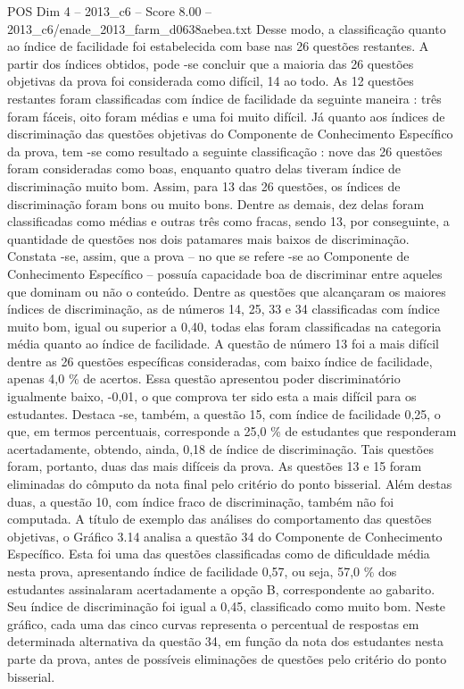 \begin{textsample}{POS Dim 4 – 2013\_c6 – Score 8.00 – 2013\_c6/enade\_2013\_farm\_d0638aebea.txt}
Desse modo, a classificação quanto ao índice de facilidade foi estabelecida com base nas 26 questões restantes.
A partir dos índices obtidos, pode -se concluir que a maioria das 26 questões objetivas da prova foi considerada como difícil, 14 ao todo.
As 12 questões restantes foram classificadas com índice de facilidade da seguinte maneira : três foram fáceis, oito foram médias e uma foi muito difícil.
Já quanto aos índices de discriminação das questões objetivas do Componente de Conhecimento Específico da prova, tem -se como resultado a seguinte classificação : nove das 26 questões foram consideradas como boas, enquanto quatro delas tiveram índice de discriminação muito bom.
Assim, para 13 das 26 questões, os índices de discriminação foram bons ou muito bons.
Dentre as demais, dez delas foram classificadas como médias e outras três como fracas, sendo 13, por conseguinte, a quantidade de questões nos dois patamares mais baixos de discriminação.
Constata -se, assim, que a prova – no que se refere -se ao Componente de Conhecimento Específico – possuía capacidade boa de discriminar entre aqueles que dominam ou não o conteúdo.
Dentre as questões que alcançaram os maiores índices de discriminação, as de números 14, 25, 33 e 34 classificadas com índice muito bom, igual ou superior a 0,40, todas elas foram classificadas na categoria média quanto ao índice de facilidade.
A questão de número 13 foi a mais difícil dentre as 26 questões específicas consideradas, com baixo índice de facilidade, apenas 4,0 \% de acertos.
Essa questão apresentou poder discriminatório igualmente baixo, -0,01, o que comprova ter sido esta a mais difícil para os estudantes.
Destaca -se, também, a questão 15, com índice de facilidade 0,25, o que, em termos percentuais, corresponde a 25,0 \% de estudantes que responderam acertadamente, obtendo, ainda, 0,18 de índice de discriminação.
Tais questões foram, portanto, duas das mais difíceis da prova.
As questões 13 e 15 foram eliminadas do cômputo da nota final pelo critério do ponto bisserial.
Além destas duas, a questão 10, com índice fraco de discriminação, também não foi computada.
A título de exemplo das análises do comportamento das questões objetivas, o Gráfico 3.14 analisa a questão 34 do Componente de Conhecimento Específico.
Esta foi uma das questões classificadas como de dificuldade média nesta prova, apresentando índice de facilidade 0,57, ou seja, 57,0 \% dos estudantes assinalaram acertadamente a opção B, correspondente ao gabarito.
Seu índice de discriminação foi igual a 0,45, classificado como muito bom.
Neste gráfico, cada uma das cinco curvas representa o percentual de respostas em determinada alternativa da questão 34, em função da nota dos estudantes nesta parte da prova, antes de possíveis eliminações de questões pelo critério do ponto bisserial.

\end{textsample}
